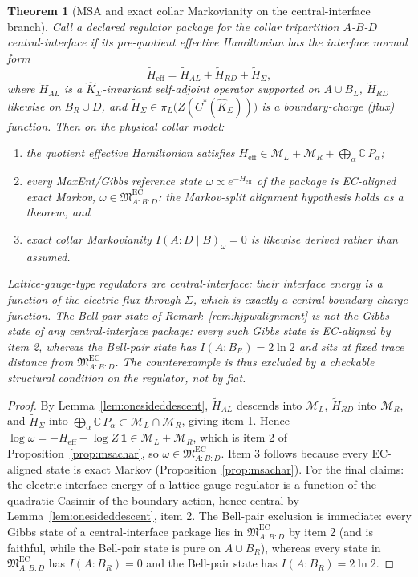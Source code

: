 \documentclass[11pt]{article}
\newtheorem{theorem}{Theorem}[section]
\begin{document}
\begin{theorem}[MSA and exact collar Markovianity on the central-interface branch]\label{thm:msaderivation}
Call a declared regulator package for the collar tripartition \(A\)-\(B\)-\(D\) \emph{central-interface} if its pre-quotient effective Hamiltonian has the interface normal form
\[
\widetilde H_{\mathrm{eff}}
=
\widetilde H_{AL}+\widetilde H_{RD}+\widetilde H_\Sigma,
\]
where \(\widetilde H_{AL}\) is a \(\widehat K_\Sigma\)-invariant self-adjoint operator supported on \(A\cup B_L\), \(\widetilde H_{RD}\) likewise on \(B_R\cup D\), and \(\widetilde H_\Sigma\in\pi_L\bigl(Z(C^*(\widehat K_\Sigma))\bigr)\) is a boundary-charge (flux) function. Then on the physical collar model:
\begin{enumerate}[leftmargin=2em]
\item the quotient effective Hamiltonian satisfies \(H_{\mathrm{eff}}\in\mathcal M_L+\mathcal M_R+\bigoplus_\alpha\mathbb C\,P_\alpha\);
\item every MaxEnt/Gibbs reference state \(\omega\propto e^{-H_{\mathrm{eff}}}\) of the package is EC-aligned exact Markov, \(\omega\in\mathfrak M^{\mathrm{EC}}_{A:B:D}\): the Markov-split alignment hypothesis \emph{holds as a theorem}, and
\item exact collar Markovianity \(I(A:D\mid B)_\omega=0\) is likewise derived rather than assumed.
\end{enumerate}
Lattice-gauge-type regulators are central-interface: their interface energy is a function of the electric flux through \(\Sigma\), which is exactly a central boundary-charge function. The Bell-pair state of Remark~\ref{rem:hjpwalignment} is \emph{not} the Gibbs state of any central-interface package: every such Gibbs state is EC-aligned by item 2, whereas the Bell-pair state has \(I(A:B_R)=2\ln2\) and sits at fixed trace distance from \(\mathfrak M^{\mathrm{EC}}_{A:B:D}\). The counterexample is thus excluded by a checkable structural condition on the regulator, not by fiat.
\end{theorem}

\begin{proof}
By Lemma~\ref{lem:onesideddescent}, \(\widetilde H_{AL}\) descends into \(\mathcal M_L\), \(\widetilde H_{RD}\) into \(\mathcal M_R\), and \(\widetilde H_\Sigma\) into \(\bigoplus_\alpha\mathbb C\,P_\alpha\subset\mathcal M_L\cap\mathcal M_R\), giving item 1. Hence \(\log\omega=-H_{\mathrm{eff}}-\log Z\,\mathbf 1\in\mathcal M_L+\mathcal M_R\), which is item 2 of Proposition~\ref{prop:msachar}, so \(\omega\in\mathfrak M^{\mathrm{EC}}_{A:B:D}\). Item 3 follows because every EC-aligned state is exact Markov (Proposition~\ref{prop:msachar}). For the final claims: the electric interface energy of a lattice-gauge regulator is a function of the quadratic Casimir of the boundary action, hence central by Lemma~\ref{lem:onesideddescent}, item 2. The Bell-pair exclusion is immediate: every Gibbs state of a central-interface package lies in \(\mathfrak M^{\mathrm{EC}}_{A:B:D}\) by item 2 (and is faithful, while the Bell-pair state is pure on \(A\cup B_R\)), whereas every state in \(\mathfrak M^{\mathrm{EC}}_{A:B:D}\) has \(I(A:B_R)=0\) and the Bell-pair state has \(I(A:B_R)=2\ln 2\).
\end{proof}
\end{document}
